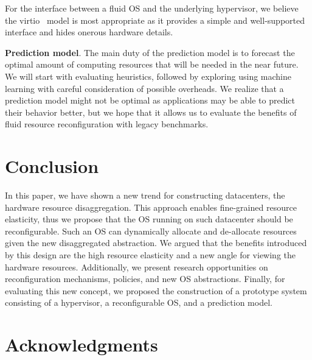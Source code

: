 For the interface between a fluid OS and the underlying hypervisor,
we believe the virtio~\cite{jones2010virtio} model is most appropriate
as it provides a simple and well-supported interface and hides
onerous hardware details.

\noindent \textbf{Prediction model}. The main duty of the prediction
model is to forecast the optimal amount of computing resources that
will be needed in the near future.  We will start with evaluating
heuristics, followed by exploring using machine learning
with careful consideration of possible overheads.
We realize that a prediction model might not be optimal
as applications may be able to predict their behavior better,
but we hope that it allows us to evaluate the benefits of fluid
resource reconfiguration with legacy benchmarks.
 
\section{Conclusion}
\label{sec:conclusion}
In this paper, we have shown a new trend for constructing datacenters,
the hardware resource disaggregation. This approach enables
fine-grained resource elasticity, thus we propose that the OS running
on such datacenter should be reconfigurable. Such an OS can
dynamically allocate and de-allocate resources given the new
disaggregated abstraction. We argued that the benefits introduced by
this design are the high resource elasticity and a new angle for
viewing the hardware resources.  Additionally, we present research
opportunities on reconfiguration mechanisms, policies, and new OS
abstractions. Finally, for evaluating this new concept, we proposed
the construction of a prototype system consisting of a hypervisor, a
reconfigurable OS, and a prediction model.
 
\ifacknowledgments
\section*{Acknowledgments}
\fi

\finalpage

\balance

{\footnotesize 
}

\checkpagelimit  
